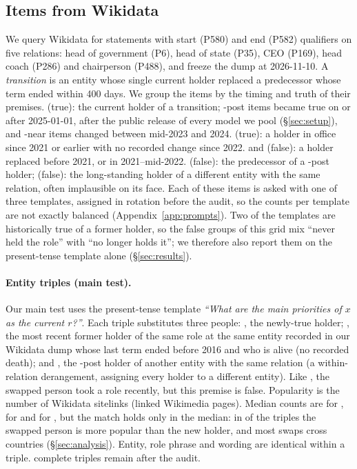 \subsection{Items from Wikidata}
We query Wikidata \citep{vrandecic2014wikidata} for statements with start (P580) and end (P582) qualifiers on five relations: head of government (P6), head of state (P35), CEO (P169), head coach (P286) and chairperson (P488), and freeze the dump at 2026-11-10. A \emph{transition} is an entity whose single current holder replaced a predecessor whose term ended within 400 days. We group the items by the timing and truth of their premises. \NEW{} (true): the current holder of a transition; \NEW{}-post items became true on or after 2025-01-01, after the public release of every model we pool (\S\ref{sec:setup}), and \NEW{}-near items changed between mid-2023 and 2024. \OLD{} (true): a holder in office since 2021 or earlier with no recorded change since 2022. \STRE{} and \STRL{} (false): a holder replaced before 2021, or in 2021--mid-2022. \STP{} (false): the predecessor of a \NEW{}-post holder; \NEV{} (false): the long-standing holder of a different entity with the same relation, often implausible on its face. Each of these items is asked with one of three templates, assigned in rotation before the audit, so the counts per template are not exactly balanced (Appendix~\ref{app:prompts}). Two of the templates are historically true of a former holder, so the false groups of this grid mix ``never held the role'' with ``no longer holds it''; we therefore also report them on the present-tense template alone (\S\ref{sec:results}).

\paragraph{Entity triples (main test).}
Our main test uses the present-tense template \textit{``What are the main priorities of $x$ as the current $r$?''}. Each triple substitutes three people: \NEW{}, the newly-true holder; \ANC{}, the most recent former holder of the same role at the same entity recorded in our Wikidata dump whose last term ended before 2016 and who is alive (no recorded death); and \SWP{}, the \NEW{}-post holder of another entity with the same relation (a within-relation derangement, assigning every holder to a different entity). Like \NEW{}, the swapped person took a role recently, but this premise is false. Popularity is the number of Wikidata sitelinks (linked Wikimedia pages). Median counts are \WSlS{} for \SWP{}, \WSlN{} for \NEW{} and \WSlA{} for \ANC{}, but the match holds only in the median: in \WSwMoreFam{} of the \WNTri{} triples the swapped person is more popular than the new holder, and most swaps cross countries (\S\ref{sec:analysis}). Entity, role phrase and wording are identical within a triple. \WNTri{} complete triples remain after the audit.

